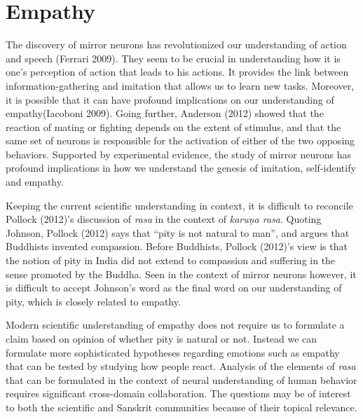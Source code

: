 \section*{Empathy}

The discovery of mirror neurons has revolutionized our understanding of action and speech (Ferrari 2009). They seem to be crucial in understanding how it is one's perception of action that leads to his actions. It provides the link between information-gathering and imitation that allows us to learn new tasks. Moreover, it is possible that it can have profound implications on our understanding of empathy\break (Iacoboni 2009). Going further, Anderson (2012) showed that the reaction of mating or fighting depends on the extent of stimulus, and that the same set of neurons is responsible for the activation of either of the two opposing behaviors. Supported by experimental evidence, the study of mirror neurons has profound implications in how we understand the genesis of imitation, self-identify and empathy. 

Keeping the current scientific understanding in context, it is difficult to reconcile Pollock (2012)’s discussion of \textsl{rasa} in the context of \textsl{karuṇa rasa}. Quoting Johnson, Pollock (2012) says that “pity is not natural to man”, and argues that Buddhists invented compassion. Before Buddhists, Pollock (2012)’s view is that the notion of pity in India did not extend to compassion and suffering in the sense promoted by the Buddha. Seen in the context of mirror neurons however, it is difficult to accept Johnson’s word as the final word on our understanding of pity, which is closely related to empathy.

Modern scientific understanding of empathy does not require us to formulate a claim based on opinion of whether pity is natural or not. Instead we can formulate more sophisticated hypotheses regarding emotions such as empathy that can be tested by studying how people react. Analysis of the elements of \textsl{rasa} that can be formulated in the context of neural understanding of human behavior requires significant cross-domain collaboration. The questions may be of interest to both the scientific and Sanskrit communities because of their topical relevance.\\[-20pt]

